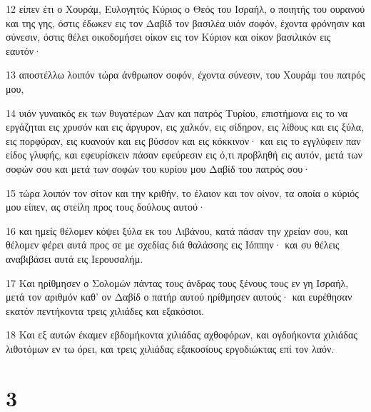 \par 12 είπεν έτι ο Χουράμ, Ευλογητός Κύριος ο Θεός του Ισραήλ, ο ποιητής του ουρανού και της γης, όστις έδωκεν εις τον Δαβίδ τον βασιλέα υιόν σοφόν, έχοντα φρόνησιν και σύνεσιν, όστις θέλει οικοδομήσει οίκον εις τον Κύριον και οίκον βασιλικόν εις εαυτόν·
\par 13 αποστέλλω λοιπόν τώρα άνθρωπον σοφόν, έχοντα σύνεσιν, του Χουράμ του πατρός μου,
\par 14 υιόν γυναικός εκ των θυγατέρων Δαν και πατρός Τυρίου, επιστήμονα εις το να εργάζηται εις χρυσόν και εις άργυρον, εις χαλκόν, εις σίδηρον, εις λίθους και εις ξύλα, εις πορφύραν, εις κυανούν και εις βύσσον και εις κόκκινον· και εις το εγγλύφειν παν είδος γλυφής, και εφευρίσκειν πάσαν εφεύρεσιν εις ό,τι προβληθή εις αυτόν, μετά των σοφών σου και μετά των σοφών του κυρίου μου Δαβίδ του πατρός σου·
\par 15 τώρα λοιπόν τον σίτον και την κριθήν, το έλαιον και τον οίνον, τα οποία ο κύριός μου είπεν, ας στείλη προς τους δούλους αυτού·
\par 16 και ημείς θέλομεν κόψει ξύλα εκ του Λιβάνου, κατά πάσαν την χρείαν σου, και θέλομεν φέρει αυτά προς σε με σχεδίας διά θαλάσσης εις Ιόππην· και συ θέλεις αναβιβάσει αυτά εις Ιερουσαλήμ.
\par 17 Και ηρίθμησεν ο Σολομών πάντας τους άνδρας τους ξένους τους εν γη Ισραήλ, μετά τον αριθμόν καθ' ον Δαβίδ ο πατήρ αυτού ηρίθμησεν αυτούς· και ευρέθησαν εκατόν πεντήκοντα τρεις χιλιάδες και εξακόσιοι.
\par 18 Και εξ αυτών έκαμεν εβδομήκοντα χιλιάδας αχθοφόρων, και ογδοήκοντα χιλιάδας λιθοτόμων εν τω όρει, και τρεις χιλιάδας εξακοσίους εργοδιώκτας επί τον λαόν.

\chapter{3}

